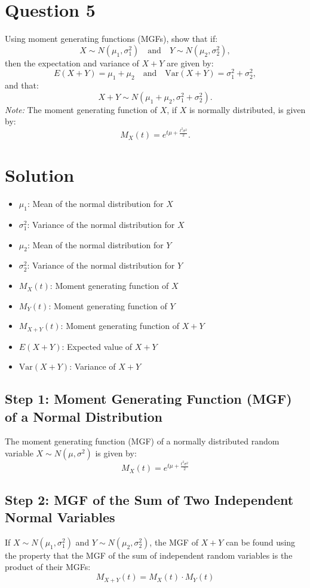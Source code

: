\documentclass[12pt]{article}
\begin{document}
\newpage
\section*{Question 5}
Using moment generating functions (MGFs), show that if:
\[ X \sim N(\mu_1, \sigma_1^2) \quad \text{and} \quad Y \sim N(\mu_2, \sigma_2^2), \]
then the expectation and variance of \( X+Y \) are given by:
\[ E(X+Y) = \mu_1 + \mu_2 \quad \text{and} \quad \text{Var}(X+Y) = \sigma_1^2 + \sigma_2^2, \]
and that:
\[ X + Y \sim N(\mu_1 + \mu_2, \sigma_1^2 + \sigma_2^2). \]
\textit{Note:} The moment generating function of \( X \), if \( X \) is normally distributed, is given by:
\[ M_X(t) = e^{t\mu + \frac{t^2\sigma^2}{2}}. \]

\section*{Solution}
\begin{itemize}
  \item \( \mu_1 \): Mean of the normal distribution for \( X \)
  \item \( \sigma_1^2 \): Variance of the normal distribution for \( X \)
  \item \( \mu_2 \): Mean of the normal distribution for \( Y \)
  \item \( \sigma_2^2 \): Variance of the normal distribution for \( Y \)
  \item \( M_X(t) \): Moment generating function of \( X \)
  \item \( M_Y(t) \): Moment generating function of \( Y \)
  \item \( M_{X+Y}(t) \): Moment generating function of \( X + Y \)
  \item \( E(X+Y) \): Expected value of \( X + Y \)
  \item \( \text{Var}(X+Y) \): Variance of \( X + Y \)
\end{itemize}
\subsection*{Step 1: Moment Generating Function (MGF) of a Normal Distribution}
The moment generating function (MGF) of a normally distributed random variable \( X \sim N(\mu, \sigma^2) \) is given by:
\[ M_X(t) = e^{t\mu + \frac{t^2\sigma^2}{2}} \]

\subsection*{Step 2: MGF of the Sum of Two Independent Normal Variables}
If \( X \sim N(\mu_1, \sigma_1^2) \) and \( Y \sim N(\mu_2, \sigma_2^2) \), the MGF of \( X + Y \) can be found using the property that the MGF of the sum of independent random variables is the product of their MGFs:
\[ M_{X+Y}(t) = M_X(t) \cdot M_Y(t) \]
\end{document}
